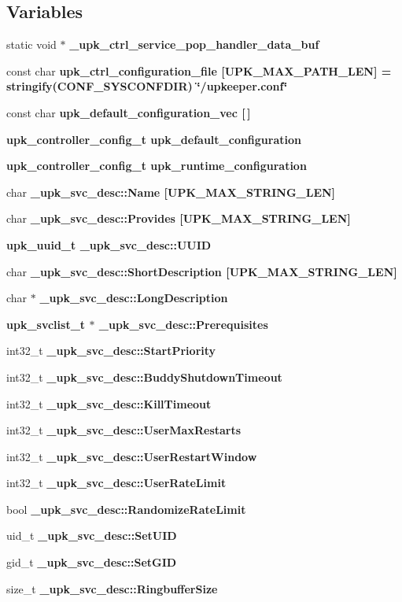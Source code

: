\subsection*{Variables}
\begin{CompactItemize}
\item 
static void $\ast$ \bf{\_\-upk\_\-ctrl\_\-service\_\-pop\_\-handler\_\-data\_\-buf}
\item 
const char \bf{upk\_\-ctrl\_\-configuration\_\-file} [UPK\_\-MAX\_\-PATH\_\-LEN] = stringify(CONF\_\-SYSCONFDIR) \char`\"{}/upkeeper.conf\char`\"{}
\item 
const char \bf{upk\_\-default\_\-configuration\_\-vec} [$\,$]
\item 
\bf{upk\_\-controller\_\-config\_\-t} \bf{upk\_\-default\_\-configuration}
\item 
\bf{upk\_\-controller\_\-config\_\-t} \bf{upk\_\-runtime\_\-configuration}
\item 
char \bf{\_\-upk\_\-svc\_\-desc::Name} [UPK\_\-MAX\_\-STRING\_\-LEN]
\item 
char \bf{\_\-upk\_\-svc\_\-desc::Provides} [UPK\_\-MAX\_\-STRING\_\-LEN]
\item 
\bf{upk\_\-uuid\_\-t} \bf{\_\-upk\_\-svc\_\-desc::UUID}
\item 
char \bf{\_\-upk\_\-svc\_\-desc::Short\-Description} [UPK\_\-MAX\_\-STRING\_\-LEN]
\item 
char $\ast$ \bf{\_\-upk\_\-svc\_\-desc::Long\-Description}
\item 
\bf{upk\_\-svclist\_\-t} $\ast$ \bf{\_\-upk\_\-svc\_\-desc::Prerequisites}
\item 
int32\_\-t \bf{\_\-upk\_\-svc\_\-desc::Start\-Priority}
\item 
int32\_\-t \bf{\_\-upk\_\-svc\_\-desc::Buddy\-Shutdown\-Timeout}
\item 
int32\_\-t \bf{\_\-upk\_\-svc\_\-desc::Kill\-Timeout}
\item 
int32\_\-t \bf{\_\-upk\_\-svc\_\-desc::User\-Max\-Restarts}
\item 
int32\_\-t \bf{\_\-upk\_\-svc\_\-desc::User\-Restart\-Window}
\item 
int32\_\-t \bf{\_\-upk\_\-svc\_\-desc::User\-Rate\-Limit}
\item 
bool \bf{\_\-upk\_\-svc\_\-desc::Randomize\-Rate\-Limit}
\item 
uid\_\-t \bf{\_\-upk\_\-svc\_\-desc::Set\-UID}
\item 
gid\_\-t \bf{\_\-upk\_\-svc\_\-desc::Set\-GID}
\item 
size\_\-t \bf{\_\-upk\_\-svc\_\-desc::Ringbuffer\-Size}

\end{CompactItemize}
